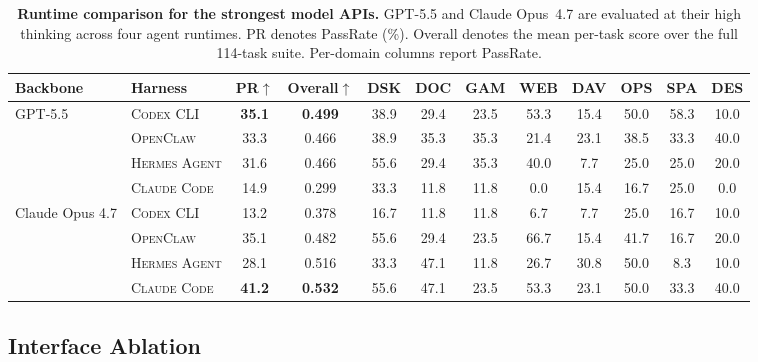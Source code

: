 \documentclass{llmxive}
\providecommand{\arraystretch}{1.2}
\begin{document}
\begin{table}[t]
\centering
\footnotesize
\setlength{\tabcolsep}{3pt}
\renewcommand{\arraystretch}{1.15}
\begin{tabular}{l l cc | cccccccc}
\toprule
\textbf{Backbone} & \textbf{Harness} & \textbf{PR}$\uparrow$ & \textbf{Overall}$\uparrow$ & \textbf{DSK} & \textbf{DOC} & \textbf{GAM} & \textbf{WEB} & \textbf{DAV} & \textbf{OPS} & \textbf{SPA} & \textbf{DES} \\
\midrule
\multirow{4}{*}{GPT-5.5}
& \textsc{Codex CLI}    & \textbf{35.1} & \textbf{0.499} & 38.9 & 29.4 & 23.5 & 53.3 & 15.4 & 50.0 & 58.3 & 10.0 \\
& \textsc{OpenClaw}     & 33.3          & 0.466          & 38.9 & 35.3 & 35.3 & 21.4 & 23.1 & 38.5 & 33.3 & 40.0 \\
& \textsc{Hermes Agent} & 31.6          & 0.466          & 55.6 & 29.4 & 35.3 & 40.0 &  7.7 & 25.0 & 25.0 & 20.0 \\
& \textsc{Claude Code}  & 14.9          & 0.299          & 33.3 & 11.8 & 11.8 &  0.0 & 15.4 & 16.7 & 25.0 &  0.0 \\
\midrule
\multirow{4}{*}{Claude Opus 4.7}
& \textsc{Codex CLI}    & 13.2          & 0.378          & 16.7 & 11.8 & 11.8 &  6.7 &  7.7 & 25.0 & 16.7 & 10.0 \\
& \textsc{OpenClaw}     & 35.1          & 0.482          &  55.6 & 29.4 & 23.5 & 66.7 & 15.4 & 41.7 & 16.7 & 20.0 \\
& \textsc{Hermes Agent} & 28.1          & 0.516          & 33.3 & 47.1 & 11.8 & 26.7 & 30.8 & 50.0 &  8.3 & 10.0 \\
& \textsc{Claude Code}  & \textbf{41.2} & \textbf{0.532} & 55.6 & 47.1 & 23.5 & 53.3 & 23.1 & 50.0 & 33.3 & 40.0 \\
\bottomrule
\end{tabular}
\caption{\textbf{Runtime comparison for the strongest model APIs.}
GPT-5.5 and Claude Opus~4.7 are evaluated at their high thinking across four agent runtimes. PR denotes PassRate (\%). Overall denotes the mean per-task score over the full 114-task suite. Per-domain columns report PassRate.}
\label{tab:cross-harness}
\end{table}

\subsection{Interface Ablation}
\label{sec:channel-ablation}
\end{document}
